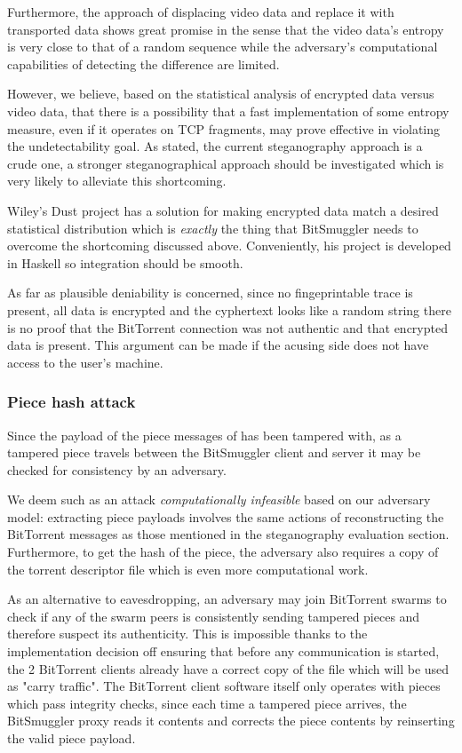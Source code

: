 \documentclass[11pt]{book} %
\newcommand{\projectName}{BitSmuggler }
\begin{document}
Furthermore, the approach of displacing video data and replace it with transported data shows great promise in the sense that the video data's entropy is very close to that of a random sequence while the adversary's computational capabilities of detecting the difference are limited.

However, we believe, based on the statistical analysis of encrypted data versus video data, that there is a possibility that a fast implementation of some entropy measure, even if it operates on TCP fragments, may prove effective in violating the undetectability goal. As stated, the current steganography approach is a crude one, a stronger steganographical approach should be investigated which is very likely to alleviate this shortcoming. 

Wiley's Dust project \citep*{web:dust} has a solution for making encrypted data match a desired statistical distribution which is \textit{exactly} the thing that \projectName needs to overcome the shortcoming discussed above. Conveniently, his project is developed in Haskell so integration should be smooth.

As far as plausible deniability is concerned, since no fingeprintable trace is present, all data is encrypted and the cyphertext looks like a random string there is no proof that the BitTorrent connection was not authentic and that encrypted data is present. This argument can be made if the acusing side does not have access to the user's machine.

\subsubsection{Piece hash attack}

Since the payload of the piece messages of has been tampered with, as a tampered piece travels between the \projectName client and server it may be checked for consistency by an adversary.

We deem such as an attack \textit{computationally infeasible} based on our adversary model: extracting piece payloads involves the same actions of reconstructing the BitTorrent messages as those mentioned in the steganography evaluation section. Furthermore, to get the hash of the piece, the adversary also requires a copy of the torrent descriptor file which is even more computational work.

As an alternative to eavesdropping, an adversary may join BitTorrent swarms to check if any of the swarm peers is consistently sending tampered pieces and therefore suspect its authenticity. This is impossible thanks to the implementation decision off ensuring that before any communication is started, the 2 BitTorrent clients already have a correct copy of the file which will be used as "carry traffic". The BitTorrent client software itself only operates with pieces which pass integrity checks, since each time a tampered piece arrives, the \projectName proxy reads it contents and corrects the piece contents by reinserting the valid piece payload. 
\end{document}
